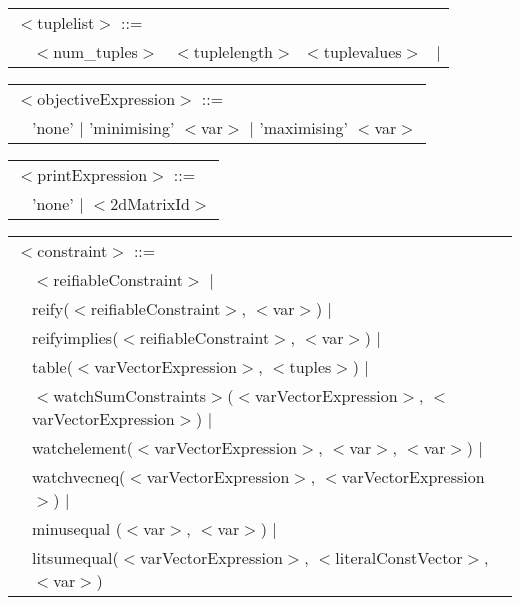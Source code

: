 \documentclass{article}
\begin{document}
\begin{small}
\noindent
\setlength{\tabcolsep}{0mm}
\begin{tabular}{ll}
\multicolumn{2}{l}{$<$tuplelist$>$ ::=}\\
\hspace*{2mm} &   $<$num\_tuples$>$ \ $<$tuplelength$>$\  $<$tuplevalues$> $ \  $|$ \\
\end{tabular}
\vspace*{1mm}


\noindent
\setlength{\tabcolsep}{0mm}
\begin{tabular}{ll}
\multicolumn{2}{l}{$<$objectiveExpression$>$ ::=}\\
\hspace*{2mm} & 'none' $|$ 'minimising' $<$var$>$ $|$ 'maximising' $<$var$>$\\
\end{tabular}
\vspace*{1mm}

\noindent
\setlength{\tabcolsep}{0mm}
\begin{tabular}{ll}
\multicolumn{2}{l}{$<$printExpression$>$ ::=}\\
\hspace*{2mm} & 'none' $|$ $<$2dMatrixId$>$\\
\end{tabular}
\vspace*{1mm}

\noindent
\setlength{\tabcolsep}{0mm}
\begin{tabular}{ll}
\multicolumn{2}{l}{$<$constraint$>$ ::=}\\
\hspace*{2mm} & $<$reifiableConstraint$>$ $|$\\
               & reify($<$reifiableConstraint$>$, $<$var$>$) $|$\\
              & reifyimplies($<$reifiableConstraint$>$, $<$var$>$) $|$\\
              & table($<$varVectorExpression$>$, $<$tuples$>$) $|$\\
              & $<$watchSumConstraints$>$($<$varVectorExpression$>$, $<$varVectorExpression$>$) $|$\\
              & watchelement($<$varVectorExpression$>$, $<$var$>$, $<$var$>$) $|$\\
              & watchvecneq($<$varVectorExpression$>$, $<$varVectorExpression$>$) $|$\\
              & minusequal ($<$var$>$, $<$var$>$) $|$\\
             & litsumequal($<$varVectorExpression$>$, $<$literalConstVector$>$, $<$var$>$) \\
             

\end{tabular}
\end{small}
\end{document}
